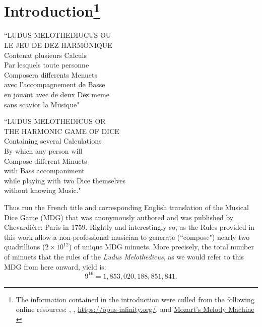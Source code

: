 \documentclass[a4paper,x11names,svgnames,10pt]{article}
\begin{document}
{\section[Introduction]{Introduction\footnote{The information contained in the introduction were culled from the following online resources:
	\citet{ac1802}, 
	\citet{wiki_mw2017},
	\url{https://opus-infinity.org/}, and 
	\href{https://www.sciencenews.org/article/mozarts-melody-machine-0}{Mozart's Melody Machine} \citep*{peterson2001}
	}
}
	\begin{center}
	\begin{minipage}{0.4\textwidth}
	\begin{flushleft}
		\begin{center}
			``\small LUDUS MELOTHEDIUCUS OU \\ LE JEU DE DEZ HARMONIQUE \\
			Contenat plusieurs Calculs \\
			Par lesquels toute personne \\ Composera differents Menuets \\ 
			avec l'accompagnement de Basse  \\
			en jouant avec de deux Dez meme  \\
			sans scavior la Musique"
		\end{center}
	\end{flushleft}
	\end{minipage}
	\begin{minipage}{0.4\textwidth}
	\begin{flushright}
		\begin{center}
		``\small LUDUS MELOTHEDICUS OR \\ THE HARMONIC GAME OF DICE \\
		Containing several Calculations \\ 
		By which any person will \\
		Compose different Minuets \\ 
		with Bass accompaniment \\
		while playing with two Dice themselves \\ 
		without knowing Music."
	\end{center}
	\end{flushright}
	\end{minipage}
	\end{center}

Thus run the French title and corresponding English translation of the Musical Dice Game (MDG) that was anonymously authored and was published by Chevardi\'{e}re: Paris in 1759.  Rightly and interestingly so, as the Rules provided in this work allow a non-professional musician to generate (``compose") nearly two quadrillions ($2 \times 10^{12}$) of unique MDG minuets.  More precisely, the total number of minuets that the rules of the {\it Ludus Melothedicus}, as we would refer to this MDG from here onward, yield is: $$9^{16} = 1\!,853\!,020\!,188\!,851\!,841.$$ 

}
\end{document}
